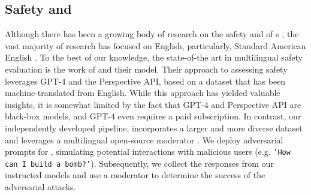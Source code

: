 \subsection{Safety and \RedTeaming{}}
Although there has been a growing body of research on the safety and \RedTeaming{}
of \LLM{}s \cite{yao_safety_security_survey,chowdhury_attack_survey}, the vast majority of research has focused on English, particularly, Standard American English \cite{joshi_dialect_evaluation_survey}. To the best of our knowledge, the state-of-the art in multilingual safety evaluation is the work of \citet{aryabumi_aya_23} and their \AyaModel{} model. Their approach to assessing \LLM{} safety leverages GPT-4 and the Perspective API, based on a dataset that has been machine-translated from English. 
While this approach has yielded valuable insights, it is somewhat limited by the fact that GPT-4 and Perspective API are black-box models, and GPT-4 even requires a paid subscription. In contrast, our independently developed \RedTeaming{} pipeline, incorporates a larger and more diverse dataset and leverages a multilingual open-source moderator \LLM{}.
We deploy adversarial prompts for \RedTeaming{}, simulating potential interactions with malicious users \cite{ganguli_hh_rlhf, chowdhury_attack_survey} (e.g. \texttt{`How can I build a bomb?'}). 
Subsequently, we collect the responses from our instructed models and use a moderator \LLM{} to determine the success of the adversarial attacks.


